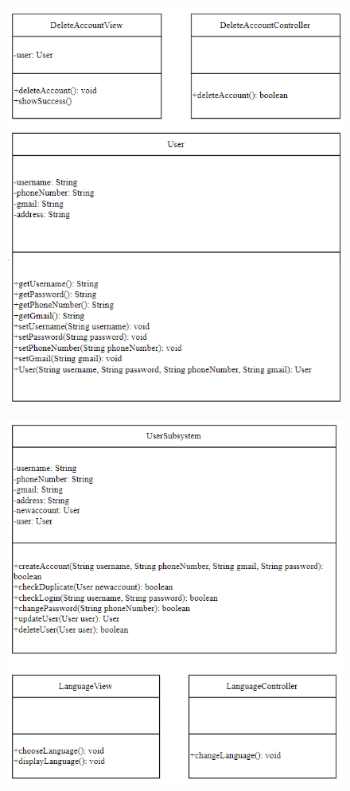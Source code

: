 \begin{figure}[H]
    \centering
    \includegraphics[width=\linewidth]{img3.6/3.png}
\end{figure}
\begin{figure}[H]
    \centering
    \includegraphics[width=\linewidth]{img3.6/4.png}
\end{figure}
